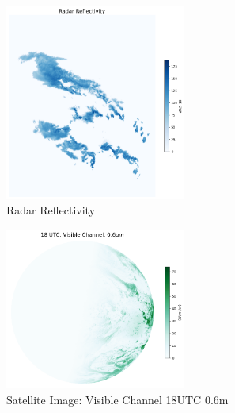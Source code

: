 \documentclass[acmtog, authorversion]{acmart}
\begin{document}
\begin{figure}
    \centering
    \includegraphics[width=225]{report/images/radar_reflectivity.png}
    \caption{Radar Reflectivity}
    \label{fig:reflect}
\end{figure}

\begin{figure}
    \centering
    \includegraphics[width=225]{report/images/vis_006.png}
    \caption{Satellite Image: Visible Channel 18UTC 0.6\mu m}
    \label{fig:vis}
\end{figure}
\end{document}
